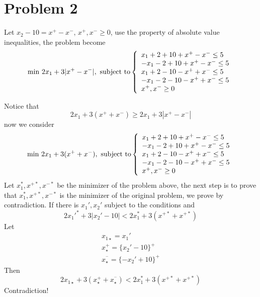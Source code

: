 \documentclass{article}
\begin{document}
\section*{Problem 2}
Let $x_2-10=x^+-x^-,\, x^+,x^-\geq 0$, use the property of absolute value inequalities, the problem become
\begin{equation}  
\min \, 2x_1+3|x^+-x^-|, \textnormal{ subject to}
\left\{  
             \begin{array}{ll}
             x_1+2+10+x^+-x^-\leq 5\\
             -x_1-2+10+x^+-x^-\leq 5\\
             x_1+2-10-x^++x^-\leq 5\\
             -x_1-2-10-x^++x^-\leq 5\\
             x^+,x^-\geq 0
             \end{array}  
\right.  
\end{equation}  

Notice that 
\begin{equation}  
2x_1+3(x^++x^-) \geq 2x_1+3|x^+-x^-|
\end{equation}  
now we consider 
\begin{equation}  
\min \,2x_1+3(x^++x^-) , \textnormal{ subject to}
\left\{  
             \begin{array}{ll}
             x_1+2+10+x^+-x^-\leq 5\\
             -x_1-2+10+x^+-x^-\leq 5\\
             x_1+2-10-x^++x^-\leq 5\\
             -x_1-2-10-x^++x^-\leq 5\\
             x^+,x^-\geq 0
             \end{array}  
\right.  
\end{equation}  
Let $x_1^*,x^{+*},x^{-*}$ be the minimizer of the problem above, the next step is to prove that  $x_1^*,x^{+*},x^{-*}$ is the minimizer of the original problem, we prove by contradiction.
If there is $x_1',x_2'$ subject to the conditions and 
\begin{equation}  
2x_1'^*+3|x_2'-10| < 2x_1^*+3(x^{+*}+x^{+*})
\end{equation}  
Let 
\begin{eqnarray*}  
x_{1\star}=x_1'\\
x^{+}_\star=\{x_2'-10\}^+\\
x^{^-}_\star=\{-x_2'+10\}^+
\end{eqnarray*}  
Then 
\begin{equation}  
2x_{1\star}+3(x^{+}_\star+x^{^-}_\star) < 2x_1^*+3(x^{+*}+x^{+*})
\end{equation}  
Contradiction!
\end{document}
